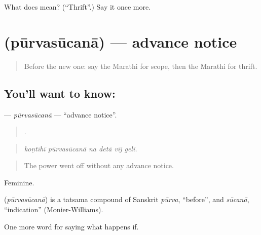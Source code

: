 \begin{tcolorbox}[breakable,colback=teal!4,colframe=teal!35!black,title={Before you move on}]
What does  mean? (\textquotedblleft{}Thrift\textquotedblright{}.) Say it once more.
\end{tcolorbox}
\section[\texorpdfstring{\mr{पूर्वसूचना} (pūrvasūcanā)}{पूर्वसूचना (pūrvasūcanā)}]{ (pūrvasūcanā) — advance notice}

\label{lesson:MR-C557-purvasucana}



\begin{quote}
Before the new one: say the Marathi for scope, then the Marathi for thrift.
\end{quote}

\subsection*{You'll want to know: }
\textbf{} — \emph{pūrvasūcanā} — \textquotedblleft{}advance notice\textquotedblright{}.

\begin{quote}
     .
\end{quote}

\begin{quote}
\emph{koṇtīhī pūrvasūcanā na detā vīj gelī.}
\end{quote}

\begin{quote}
The power went off without any advance notice.
\end{quote}

Feminine.

\begin{cousinweb}
\textbf{} (\emph{pūrvasūcanā}) is a tatsama compound of Sanskrit \emph{pūrva}, \textquotedblleft{}before\textquotedblright{}, and \emph{sūcanā}, \textquotedblleft{}indication\textquotedblright{} (Monier-Williams).
\end{cousinweb}

\begin{grammarlens}[title={What you've built}]
One more word for saying what happens if.
\end{grammarlens}

